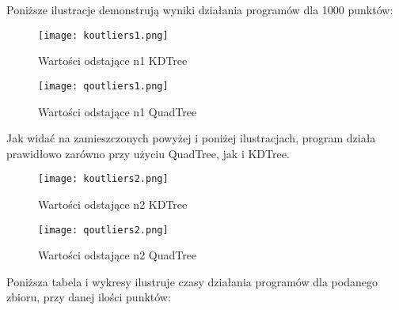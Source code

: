 \documentclass[a4paper, 12pt]{article}
\begin{document}
      \noindent
      \quad Poniższe ilustracje demonstrują wyniki działania programów dla 1000 punktów:

      \newpage
      \begin{figure}[h!]
      \centering
        \texttt{[image: koutliers1.png]}
        \caption{Wartości odstające n1 KDTree}
      \end{figure}

      \begin{figure}[h!]
      \centering
        \texttt{[image: qoutliers1.png]}
        \caption{Wartości odstające n1 QuadTree}
      \end{figure}

      \noindent
      \quad Jak widać na zamieszczonych powyżej i poniżej ilustracjach, program działa prawidłowo zarówno przy użyciu QuadTree, jak i KDTree.

      \newpage
      \begin{figure}[h!]
      \centering
        \texttt{[image: koutliers2.png]}
        \caption{Wartości odstające n2 KDTree}
      \end{figure}

      \begin{figure}[h!]
      \centering
        \texttt{[image: qoutliers2.png]}
        \caption{Wartości odstające n2 QuadTree}
      \end{figure}

      \noindent
      \quad Poniższa tabela i wykresy ilustruje czasy działania programów dla podanego zbioru, przy danej ilości punktów:
\end{document}
